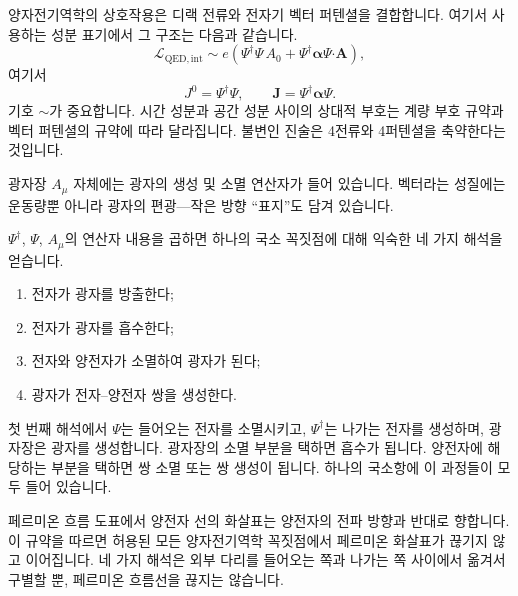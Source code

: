 양자전기역학의 상호작용은 디랙 전류와 전자기 벡터 퍼텐셜을 결합합니다. 여기서 사용하는 성분 표기에서 그 구조는 다음과 같습니다.
\begin{equation}
\mathcal L_{\mathrm{QED,int}}
\sim
e\left(
\Psi^\dagger\Psi\,A_0
+
\Psi^\dagger\boldsymbol{\alpha}\Psi\mathbin{\boldsymbol{\cdot}}\mathbf A
\right),
\end{equation}
여기서
\begin{equation}
J^0=\Psi^\dagger\Psi,
\qquad
\mathbf J=\Psi^\dagger\boldsymbol{\alpha}\Psi.
\end{equation}
기호 \(\sim\)가 중요합니다. 시간 성분과 공간 성분 사이의 상대적 부호는 계량 부호 규약과 벡터 퍼텐셜의 규약에 따라 달라집니다. 불변인 진술은 4전류와 4퍼텐셜을 축약한다는 것입니다.

광자장 \(A_\mu\) 자체에는 광자의 생성 및 소멸 연산자가 들어 있습니다. 벡터라는 성질에는 운동량뿐 아니라 광자의 편광---작은 방향 ``표지''도 담겨 있습니다.

\begin{classroomqa}
\end{classroomqa}

\(\Psi^\dagger\), \(\Psi\), \(A_\mu\)의 연산자 내용을 곱하면 하나의 국소 꼭짓점에 대해 익숙한 네 가지 해석을 얻습니다.
\begin{enumerate}\item 전자가 광자를 방출한다;
\item 전자가 광자를 흡수한다;
\item 전자와 양전자가 소멸하여 광자가 된다;
\item 광자가 전자--양전자 쌍을 생성한다.
\end{enumerate}
첫 번째 해석에서 \(\Psi\)는 들어오는 전자를 소멸시키고, \(\Psi^\dagger\)는 나가는 전자를 생성하며, 광자장은 광자를 생성합니다. 광자장의 소멸 부분을 택하면 흡수가 됩니다. 양전자에 해당하는 부분을 택하면 쌍 소멸 또는 쌍 생성이 됩니다. 하나의 국소항에 이 과정들이 모두 들어 있습니다.

페르미온 흐름 도표에서 양전자 선의 화살표는 양전자의 전파 방향과 반대로 향합니다. 이 규약을 따르면 허용된 모든 양자전기역학 꼭짓점에서 페르미온 화살표가 끊기지 않고 이어집니다. 네 가지 해석은 외부 다리를 들어오는 쪽과 나가는 쪽 사이에서 옮겨서 구별할 뿐, 페르미온 흐름선을 끊지는 않습니다.


